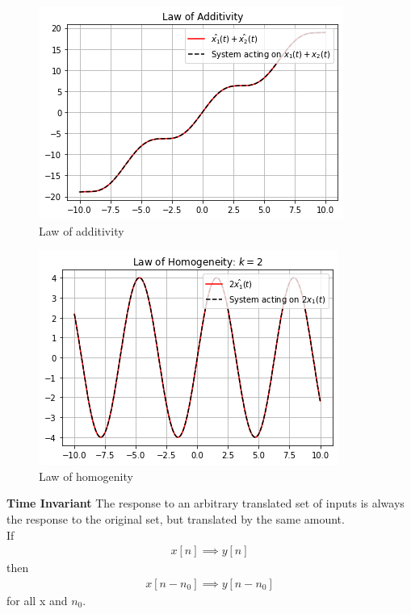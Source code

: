 \documentclass[journal,12pt,twocolumn]{IEEEtran}
\begin{document}
\begin{figure}[!htp]
    \centering
    \includegraphics[width = \columnwidth]{c.PNG}
    \caption{Law of additivity}
    \label{f31}
\end{figure}
\begin{figure}[!htp]
    \centering
    \includegraphics[width = \columnwidth]{d.PNG}
    \caption{Law of homogenity}
    \label{f41}
\end{figure}
\begin{definition}{\textbf{Time Invariant}}
The response to an arbitrary translated set of inputs is always the response to the original set, but translated by the same amount.\\
If 
\begin{align}
    x[n]\implies y[n]
\end{align}
then
\begin{align}
    x[n-n_{0}] \implies y[n-n_{0}]
\end{align} for all x and $n_{0}$.
\end{definition}
\end{document}

